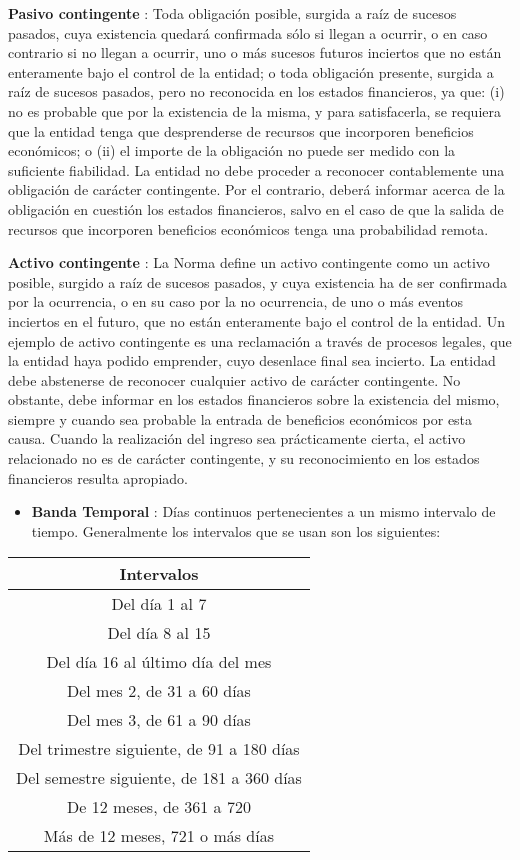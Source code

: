 \documentclass[10pt,]{article}
\providecommand{\tightlist}{%
  \setlength{\itemsep}{0pt}\setlength{\parskip}{0pt}}
\begin{document}
\textbf{Pasivo contingente} : Toda obligación posible, surgida a raíz de
sucesos pasados, cuya existencia quedará confirmada sólo si llegan a
ocurrir, o en caso contrario si no llegan a ocurrir, uno o más sucesos
futuros inciertos que no están enteramente bajo el control de la
entidad; o toda obligación presente, surgida a raíz de sucesos pasados,
pero no reconocida en los estados financieros, ya que: (i) no es
probable que por la existencia de la misma, y para satisfacerla, se
requiera que la entidad tenga que desprenderse de recursos que
incorporen beneficios económicos; o (ii) el importe de la obligación no
puede ser medido con la suficiente fiabilidad. La entidad no debe
proceder a reconocer contablemente una obligación de carácter
contingente. Por el contrario, deberá informar acerca de la obligación
en cuestión los estados financieros, salvo en el caso de que la salida
de recursos que incorporen beneficios económicos tenga una probabilidad
remota.

\textbf{Activo contingente} : La Norma define un activo contingente como
un activo posible, surgido a raíz de sucesos pasados, y cuya existencia
ha de ser confirmada por la ocurrencia, o en su caso por la no
ocurrencia, de uno o más eventos inciertos en el futuro, que no están
enteramente bajo el control de la entidad. Un ejemplo de activo
contingente es una reclamación a través de procesos legales, que la
entidad haya podido emprender, cuyo desenlace final sea incierto. La
entidad debe abstenerse de reconocer cualquier activo de carácter
contingente. No obstante, debe informar en los estados financieros sobre
la existencia del mismo, siempre y cuando sea probable la entrada de
beneficios económicos por esta causa. Cuando la realización del ingreso
sea prácticamente cierta, el activo relacionado no es de carácter
contingente, y su reconocimiento en los estados financieros resulta
apropiado.

\begin{itemize}
\tightlist
\item
  \textbf{Banda Temporal} : Días continuos pertenecientes a un mismo
  intervalo de tiempo. Generalmente los intervalos que se usan son los
  siguientes:
\end{itemize}

\begin{longtable}[]{@{}c@{}}
\toprule
Intervalos\tabularnewline
\midrule
\endhead
Del día 1 al 7\tabularnewline
Del día 8 al 15\tabularnewline
Del día 16 al último día del mes\tabularnewline
Del mes 2, de 31 a 60 días\tabularnewline
Del mes 3, de 61 a 90 días\tabularnewline
Del trimestre siguiente, de 91 a 180 días\tabularnewline
Del semestre siguiente, de 181 a 360 días\tabularnewline
De 12 meses, de 361 a 720\tabularnewline
Más de 12 meses, 721 o más días\tabularnewline
\bottomrule
\end{longtable}
\end{document}
